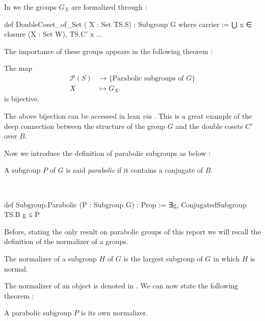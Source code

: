 In \Lean we the groups $G_X$ are formalized through :

\begin{leancode}
def DoubleCoset_of_Set ( X : Set TS.S) : Subgroup G where
  carrier := ⋃ x ∈ closure (X : Set W), TS.C' x
  ...
\end{leancode}

The importance of these groups appears in the following theorem :

\begin{theoreme} \label{thm:GX}
     
    The map \vspace{-0.2cm}
\begin{align*}
\mathcal{P}\left( S \right) &\longrightarrow \{\text{Parabolic subgroups of $G$}\} \\
X &\longmapsto G_X 
.\end{align*}
    is bijective. 
\end{theoreme}

The above bijection can be accessed in lean \textit{via}  . This is a great example of the deep connection between the structure of the group $G$ and the double cosets $C'$ over $B$.

Now we introduce the definition of parabolic subgroups as below :

\begin{definition}
    A subgroup $P$ of $G$ is said \emph{parabolic} if it contains a conjugate of $B$.
\end{definition}

\begin{implementation} \
\begin{leancode}
def Subgroup.Parabolic (P : Subgroup G) : Prop := ∃g, ConjugatedSubgroup TS.B g ≤ P
\end{leancode}
\end{implementation}  

Before, stating the only result on parabolic groups of this report we will recall the definition of the normalizer of a groups.

\begin{definition}
    The normalizer of a subgroup $H$ of $G$ is the largest subgroup of $G$ in which $H$ is normal.
\end{definition}

The normalizer of an object  is denoted  in \Lean. We can now state the following theorem :
\begin{theoreme}\label{thm:parabolic}
    A parabolic subgroup $P$ is its own normalizer.
\end{theoreme}

